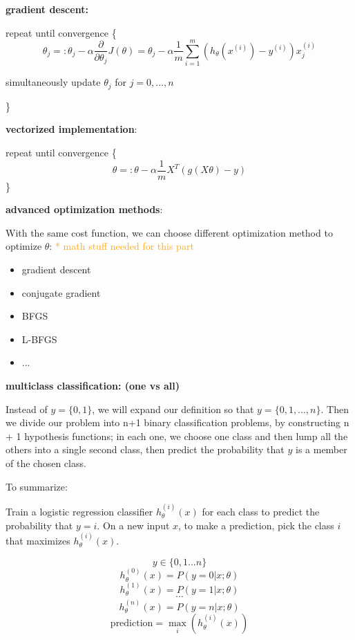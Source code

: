 \documentclass{article}
\begin{document}
\noindent \textbf{gradient descent:}

\noindent repeat until convergence \{
\[\theta_j =: \theta_j - \alpha \frac{\partial}{\partial \theta_j} J(\theta) = \theta_j - \alpha \frac{1}{m} \sum_{i = 1}^m (h_{\theta}(x^{(i)}) - y^{(i)}) x^{(i)}_j\]
\centerline{simultaneously update \(\theta_j\) for \(j = 0, \dots, n\)}
\}

\bigskip

\noindent \textbf{vectorized implementation}:

\noindent repeat until convergence \{
\[\theta =: \theta - \alpha \frac{1}{m} X^T (g(X\theta) - y)\]
\}

\bigskip

\noindent \textbf{advanced optimization methods}:

\noindent With the same cost function, we can choose different optimization method to optimize \(\theta\): \textcolor{orange}{ * math stuff needed for this part}

\begin{itemize}
\item gradient descent
\item conjugate gradient
\item BFGS
\item L-BFGS
\item ...
\end{itemize}

\bigskip

\noindent \textbf{multiclass classification: (one vs all)}

\noindent Instead of \(y = \{0, 1\}\), we will expand our definition so that \(y = \{0, 1, ..., n\}\). Then we divide our problem into n+1 binary classification problems, by constructing n + 1 hypothesis functions; in each one, we choose one class and then lump all the others into a single second class, then predict the probability that \(y\) is a member of the chosen class.

\bigskip

\noindent To summarize: 

\noindent Train a logistic regression classifier \(h_{\theta}^{(i)}(x)\) for each class to predict the probability that \(y = i\). On a new input \(x\), to make a prediction, pick the class \(i\) that maximizes \(h_{\theta} ^{(i)}(x)\).

\[y \in \{0, 1 ... n\}\] 
\[h_{\theta}^{(0)}(x) = P(y = 0 | x ; \theta)\]
\[h_{\theta}^{(1)}(x) = P(y = 1 | x ; \theta)\]
\[\cdots\]
\[h_{\theta}^{(n)}(x) = P(y = n | x ; \theta)\] 
\[\text{prediction} = \max_i(h_{\theta}^{(i)}(x))\]
\end{document}
